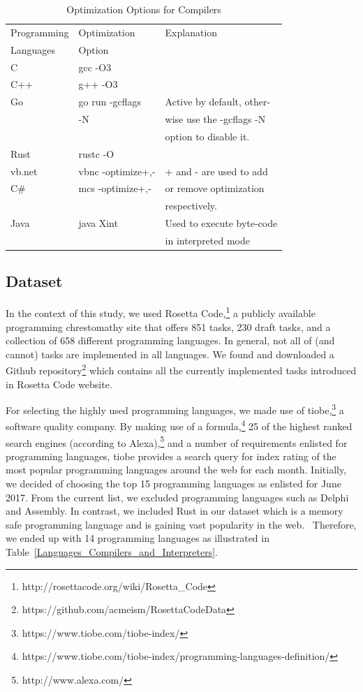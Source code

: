 \begin{table}
		\caption{Optimization Options for Compilers}
		\label{optimization flags}
		\begin{tabular}{lll}
			\toprule
			Programming & Optimization   	& Explanation \\
			Languages  	&  	Option					&\\
			\midrule
			C			& gcc -O3\\
			C++ 		& g++ -O3\\
			Go  		& go run -gcflags  	&Active by default, other-\\
						&	-N				&wise use the -gcflags -N\\
						&					&option to disable it.\\
			Rust		& rustc -O \\
			{\sc vb.net}& vbnc -optimize+,- &+ and - are used to add\\
			C\#			& mcs -optimize+,- 	& or remove optimization\\
						&					& respectively.\\
			Java		& java Xint			&Used to execute byte-code\\	
						&					&in interpreted mode\\	
			\bottomrule
		\end{tabular}
\end{table}

\subsection{Dataset}
In the context of this study, we used Rosetta 
Code,\footnote{http://rosettacode.org/wiki/Rosetta\_Code} a 
publicly available programming chrestomathy site that offers 
851 tasks, 230 draft tasks, and a collection of 658 different 
programming languages. In general, not all of (and cannot) tasks 
are implemented in all languages. 
We found and downloaded a Github repository\footnote{https://github.com/acmeism/RosettaCodeData} 
which contains all the currently implemented tasks introduced in 
Rosetta Code website.

For selecting the highly used programming languages, we made use 
of tiobe,\footnote{https://www.tiobe.com/tiobe-index/} a software 
quality company.
By making use of a formula,\footnote{https://www.tiobe.com/tiobe-index/programming-languages-definition/} 
25 of the highest ranked search engines (according to Alexa),\footnote{http://www.alexa.com/} 
and a number of requirements enlisted for programming languages, 
tiobe provides a search query for index rating of the most popular 
programming languages around the web for each month. 
Initially, we decided of choosing the top 15 programming languages 
as enlisted for June 2017. 
From the current list, we excluded programming languages such as 
Delphi and Assembly. 
In contrast, we included Rust in our dataset which is a memory safe 
programming language and is gaining vast popularity in the web. \
Therefore, we ended up with 14 programming languages as illustrated 
in Table~\ref{Languages_Compilers_and_Interpreters}.

